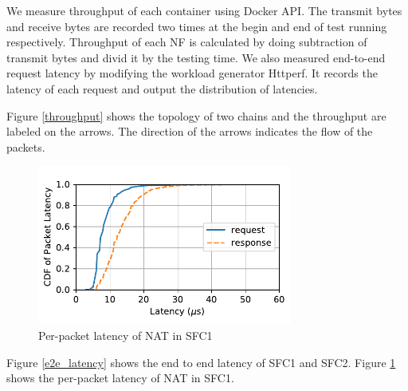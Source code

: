 We measure throughput of each container using Docker API. 
The transmit bytes and receive bytes are recorded two times 
at the begin and end of test running respectively. 
Throughput of each NF is calculated 
by doing subtraction of transmit bytes and divid it by the testing time. 
We also measured end-to-end request latency by modifying the workload generator Httperf. 
It records the latency of each request and output the distribution of latencies.

Figure \ref{throughput} shows the topology of two chains 
and the throughput are labeled on the arrows. 
The direction of the arrows indicates the flow of the packets.





\begin{figure}[t]
\centering
\includegraphics[width=3.3in]{fig/cdf_chain1.pdf}
\caption{Per-packet latency of NAT in SFC1}
\label{nat_latency}
\end{figure}

Figure \ref{e2e_latency} shows the end to end latency of SFC1 and SFC2. 
Figure \ref{nat_latency} shows the per-packet latency of NAT in SFC1. 




